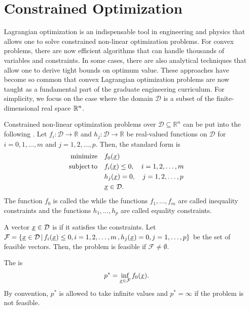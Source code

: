 \section{Constrained Optimization}
\label{sec:constrained_optimization}

Lagrangian optimization is an indispensable tool in engineering and physics that allows one to solve constrained non-linear optimization problems.
For convex problems, there are now efficient algorithms that can handle thousands of variables and constraints.
In some cases, there are also analytical techniques that allow one to derive tight bounds on optimum value.
These approaches have become so common that convex Lagrangian optimization problems are now taught as a fundamental part of the graduate engineering curriculum.
For simplicity, we focus on the case where the domain $\mathcal{D}$ is a subset of the finite-dimensional real space $\mathbb{R}^n$.

Constrained non-linear optimization problems over $\mathcal{D} \subseteq \mathbb{R}^n$ can be put into the following .
Let $f_i \colon \mathcal{D} \rightarrow \mathbb{R}$ and $h_j \colon \mathcal{D} \rightarrow \mathbb{R}$ be real-valued functions on $\mathcal{D}$ for $i=0,1,\ldots,m$ and $j=1,2,\ldots,p$.
Then, the standard form is
\begin{align*}
\mathrm{minimize} \quad & f_0 (\underline{x}) \\
\mathrm{subject\,to} \quad & f_i (\underline{x}) \leq 0, \quad i=1,2,\ldots,m \\
& h_j (\underline{x}) = 0, \quad j=1,2,\ldots,p \\
& \underline{x} \in \mathcal{D}.
\end{align*}
The function $f_0$ is called the  while the functions $f_1,\ldots,f_m$ are called inequality constraints and the functions $h_1,\ldots,h_p$ are called equality constraints.

\begin{definition}
A vector $\underline{x} \in \mathcal{D}$ is  if it satisfies the constraints.
Let $\mathcal{F} = \{ \underline{x} \in \mathcal{D} \, | \,  f_i (\underline{x}) \leq 0, i=1,2,\ldots,m \, , h_j (\underline{x}) = 0, j=1,\ldots,p \}$ be the set of feasible vectors.
Then, the problem is feasible if $\mathcal{F} \neq \emptyset$.
\end{definition}

\begin{definition}
The  is
\[ p^* = \inf_{\underline{x} \in \mathcal{F}} f_0 (\underline{x}). \]
By convention, $p^*$ is allowed to take infinite values and $p^* = \infty$ if the problem is not feasible.
\end{definition}

